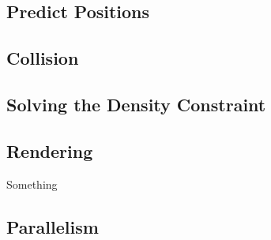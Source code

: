 

\subsection{Predict Positions}


\subsection{Collision}


\subsection{Solving the Density Constraint}


\subsection{Rendering}

Something \cite{van2009screen}

\subsection{Parallelism}

